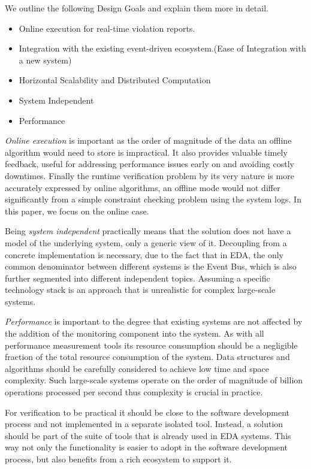 \documentclass[twocolumn]{article}
\begin{document}
We outline the following Design Goals and explain them more in detail.

\begin{itemize}
	\item Online execution for real-time violation reports.
	\item Integration with the existing event-driven ecosystem.(Ease of Integration with a new system)
	\item Horizontal Scalability and Distributed Computation
	\item System Independent
	\item Performance
\end{itemize}


\par
\emph{Online execution} is important as the order of magnitude of the data an offline algorithm would need to store is impractical.
It also provides valuable timely feedback, useful for addressing performance issues early on and avoiding costly downtimes.
Finally the runtime verification problem by its very nature is more accurately expressed by online algorithms, an offline mode
would not differ significantly from a simple constraint checking problem using the system logs. In this paper, we focus on the online case.
\par
Being \emph{system independent} practically means that the solution does not have a model of the underlying system, only a generic view of it.
Decoupling from a concrete implementation is necessary, due to the fact that in EDA, the only common denominator between different systems
is the Event Bus, which is also further segmented into different independent topics. Assuming a specific technology stack is an approach that
is unrealistic for complex large-scale systems.
\par
\emph{Performance} is important to the degree that existing systems are not affected by the addition of the monitoring component into the system.
As with all performance measurement tools its resource consumption should be a negligible fraction of the total resource consumption of the system.
Data structures and algorithms should be carefully considered to achieve low time and space complexity. Such large-scale systems operate on the order
of magnitude of billion operations processed per second thus complexity is crucial in practice.
\par
For verification to be practical it should be close to the software development process and not implemented in a separate isolated tool.
Instead, a solution should be part of the suite of tools that is already used in EDA systems. This way not only the functionality is
easier to adopt in the software development process, but also benefits from a rich ecosystem to support it.
\end{document}
